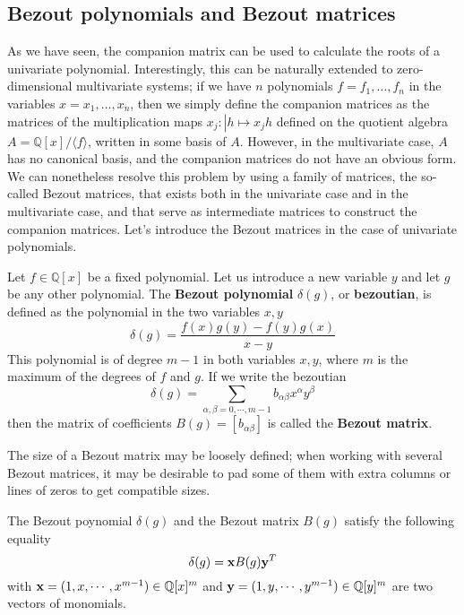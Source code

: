 \documentclass{standalone}
\begin{document}
\subsection{Bezout polynomials and Bezout matrices}
As we have seen, the companion matrix can be used to calculate the roots of a univariate polynomial. 
Interestingly, this can be naturally extended to zero-dimensional multivariate systems; 
if we have $n$ polynomials $f = f_1, \ldots, f_n$ in the variables $x = x_1, \ldots, x_n$, then we simply define the companion matrices as the matrices of the multiplication maps $x_j : \left\vert h \mapsto x_jh \right.$ defined on the quotient algebra $ A = \mathbb{Q}[x]/ \langle f\rangle$, written in some basis of $A$. 
However, in the multivariate case, $A$ has no canonical basis, and the companion matrices do not have an obvious form. 
We can nonetheless resolve this problem by using a family of matrices, the so-called Bezout matrices, that exists both in the univariate case and in the multivariate case, and that serve as intermediate matrices to construct the companion matrices. 
Let's introduce the Bezout matrices in the case of univariate polynomials.

\begin{defn}
\label{def_bez}
Let $f \in \mathbb{Q}[x]$ be a fixed polynomial. Let us introduce a new variable $y$ and let $g$ be any other polynomial. 
The {\bf Bezout polynomial} $\delta(g)$, or {\bf bezoutian}, is defined as the polynomial in the two variables $x, y$
$$
\delta(g) = \dfrac{f(x)g(y)-f(y)g(x)}{x-y}
$$
This polynomial is of degree $m-1$ in both variables $x, y$, where $m$ is the maximum of the degrees of $f$ and $g$.
If we write the bezoutian
\begin{equation}
\delta(g) = \sum_{\alpha,\beta = 0, \cdots, m-1} b_{\alpha\beta} x^\alpha y^\beta
\end{equation}
then the matrix of coefficients $B(g) = [b_{\alpha\beta}]$ is called the {\bf Bezout matrix}.
\end{defn}

\begin{rem}
The size of a Bezout matrix may be loosely defined; when working with several Bezout matrices, it may be desirable to pad some of them with extra columns or lines of zeros to get compatible sizes.
\end{rem}
\begin{rem}
The Bezout poynomial $\delta(g)$ and the Bezout matrix $B(g)$ satisfy the following equality
\begin{equation}
	\label{xBg}
	\delta(g) = \bold{x} B(g) \bold{y}^T
\end{equation}
with $\bold{x} = (1, x,\cdots, x^{m-1}) \in \mathbb{Q}[x]^m$ and $\bold{y} = (1, y,\cdots, y^{m-1}) \in \mathbb{Q}[y]^m$ are two vectors of monomials.
\end{rem}
\end{document}
